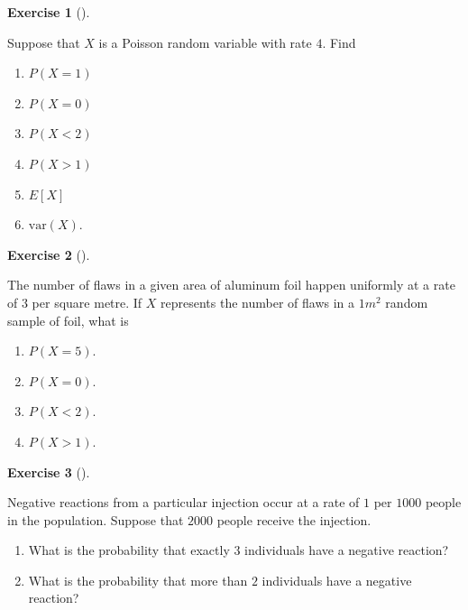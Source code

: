 \documentclass[
  letterpaper,
  DIV=11,
  numbers=noendperiod]{scrreprt}
\providecommand{\tightlist}{%
  \setlength{\itemsep}{0pt}\setlength{\parskip}{0pt}}\usepackage{longtable,booktabs,array}
\theoremstyle{definition}
\newtheorem{exercise}{Exercise}[chapter]
\theoremstyle{definition}
\theoremstyle{definition}
\theoremstyle{remark}
\begin{document}
\begin{exercise}[]\protect\hypertarget{exr-8.16}{}\label{exr-8.16}

Suppose that \(X\) is a Poisson random variable with rate \(4\). Find

\begin{enumerate}
\def\labelenumi{\alph{enumi}.}
\tightlist
\item
  \(P(X=1)\)
\item
  \(P(X=0)\)
\item
  \(P(X < 2)\)
\item
  \(P(X > 1)\)
\item
  \(E[X]\)
\item
  \(\text{var}(X)\).
\end{enumerate}

\end{exercise}

\begin{exercise}[]\protect\hypertarget{exr-8.17}{}\label{exr-8.17}

The number of flaws in a given area of aluminum foil happen uniformly at
a rate of \(3\) per square metre. If \(X\) represents the number of
flaws in a \(1m^2\) random sample of foil, what is

\begin{enumerate}
\def\labelenumi{\alph{enumi}.}
\tightlist
\item
  \(P(X=5)\).
\item
  \(P(X = 0)\).
\item
  \(P(X < 2)\).
\item
  \(P(X > 1)\).
\end{enumerate}

\end{exercise}

\begin{exercise}[]\protect\hypertarget{exr-8.18}{}\label{exr-8.18}

Negative reactions from a particular injection occur at a rate of \(1\)
per \(1000\) people in the population. Suppose that \(2000\) people
receive the injection.

\begin{enumerate}
\def\labelenumi{\alph{enumi}.}
\tightlist
\item
  What is the probability that exactly \(3\) individuals have a negative
  reaction?
\item
  What is the probability that more than \(2\) individuals have a
  negative reaction?
\end{enumerate}

\end{exercise}
\end{document}
